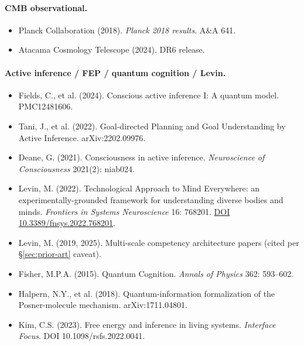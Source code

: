 \documentclass[11pt,a4paper]{article}
\begin{document}
\paragraph{CMB observational.}
\begin{itemize}[leftmargin=*,itemsep=2pt]
\item Planck Collaboration (2018). \emph{Planck 2018 results}. A\&A 641.
\item Atacama Cosmology Telescope (2024). DR6 release.
\end{itemize}

\paragraph{Active inference / FEP / quantum cognition / Levin.}
\begin{itemize}[leftmargin=*,itemsep=2pt]
\item Fields, C., et al. (2024). Conscious active inference I: A quantum model. PMC12481606.
\item Tani, J., et al. (2022). Goal-directed Planning and Goal Understanding by Active Inference. arXiv:2202.09976.
\item Deane, G. (2021). Consciousness in active inference. \emph{Neuroscience of Consciousness} 2021(2): niab024.
\item Levin, M. (2022). Technological Approach to Mind Everywhere: an experimentally-grounded framework for understanding diverse bodies and minds. \emph{Frontiers in Systems Neuroscience} 16: 768201. \href{https://doi.org/10.3389/fnsys.2022.768201}{DOI 10.3389/fnsys.2022.768201}.
\item Levin, M. (2019, 2025). Multi-scale competency architecture papers (cited per \S\ref{sec:prior-art} caveat).
\item Fisher, M.P.A. (2015). Quantum Cognition. \emph{Annals of Physics} 362: 593--602.
\item Halpern, N.Y., et al. (2018). Quantum-information formalization of the Posner-molecule mechanism. arXiv:1711.04801.
\item Kim, C.S. (2023). Free energy and inference in living systems. \emph{Interface Focus}. DOI 10.1098/rsfs.2022.0041.
\end{itemize}
\end{document}
